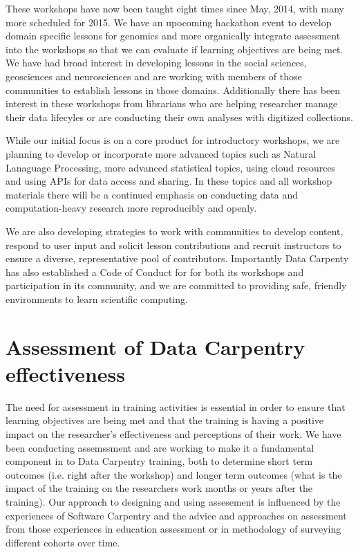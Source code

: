 \documentclass[15]{idcc}
\begin{document}
\begin{itemize}
These workshops have now been taught eight times since May, 2014, with many more scheduled for 2015. We have an
  upocoming hackathon event to develop domain specific lessons for genomics and more organically integrate assessment
  into the workshops so that we can evaluate if learning objectives are being met. We have had broad interest in developing lessons
  in the social sciences, geosciences and neurosciences and are working with members of those communities to establish lessons in those
  domains. Additionally there has been interest in these workshops from librarians who are helping researcher manage their data lifecyles
 or are conducting their own analyses with digitized collections.

 While our initial focus is on a core product for introductory workshops, we are planning to develop or incorporate more advanced topics
 such as Natural Lanaguage Processing, more advanced statistical topics, using cloud resources and using APIs for data access and sharing. In these topics and all workshop materials there will be a continued emphasis on conducting data and computation-heavy research more reproducibly and openly.


 We are also developing strategies to work with communities to develop content, respond to user input and solicit lesson contributions and recruit instructors to ensure a diverse, representative pool of contributors. Importantly Data Carpenty has also established a Code of Conduct for
 for both its workshops and participation in its community, and we are committed to providing safe, friendly environments to learn scientific computing.




\section{Assessment of Data Carpentry effectiveness}
The need for assessment in training activities is essential in order to ensure that learning objectives are being met and that the
training is having a positive impact on the researcher's effectiveness and perceptions of their work. We have been conducting
assemssment and are working to make it a fundamental component in to Data Carpentry training, both to determine short term outcomes
(i.e. right after
the workshop) and longer term outcomes (what is the impact of the training on the researchers work months or years after the
training). Our approach to designing and using assesement is influenced by
the experiences of Software Carpentry and the advice and approaches on assessment from those experiences in education assessment or
in methodology of surveying different cohorts over time. \\


\end{itemize}
\end{document}

